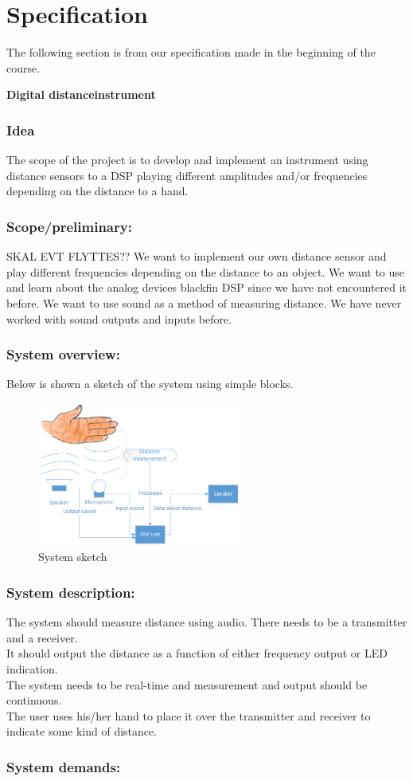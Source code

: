 \chapter{Specification}
The following section is from our specification made in the beginning of the course.\\
\begin{center}
\textbf{\HUGE Digital distanceinstrument}\\
\end{center}
\subsection{Idea}
The scope of the project is to develop and implement an instrument using distance sensors to a DSP playing different amplitudes and/or frequencies depending on the distance to a hand.\\
\subsection{Scope/preliminary:}
SKAL EVT FLYTTES??
We want to implement our own distance sensor and play different frequencies depending on the distance to an object. We want to use and learn about the analog devices blackfin DSP since we have not encountered it before. We want to use sound as a method of measuring distance. We have never worked with sound outputs and inputs before.\\
\subsection{System overview:}
Below is shown a sketch of the system using simple blocks.
\begin{figure}[H]
\centering
\includegraphics[width=0.6\textwidth]{billeder/systemoverview}
\caption{System sketch}
\label{fig:systemoverview}
\end{figure}

\subsection{System description:}
The system should measure distance using audio. There needs to be a transmitter and a receiver.\\
It should output the distance as a function of either frequency output or LED indication.\\
The system needs to be real-time and measurement and output should be continuous.\\
The user uses his/her hand to place it over the transmitter and receiver to indicate some kind of distance.\\
\subsection{System demands:}
